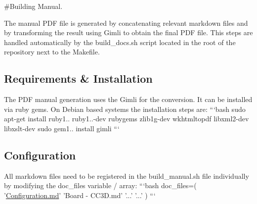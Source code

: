 \#\+Building Manual.

The manual P\+D\+F file is generated by concatenating relevant markdown files and by transforming the result using Gimli to obtain the final P\+D\+F file. This steps are handled automatically by the {\ttfamily build\+\_\+docs.\+sh} script located in the root of the repository next to the Makefile.

\subsection*{Requirements \& Installation}

The P\+D\+F manual generation uses the Gimli for the conversion. It can be installed via ruby gems. On Debian based systems the installation steps are\+: ```bash sudo apt-\/get install ruby1.. ruby1..-\/dev rubygems zlib1g-\/dev wkhtmltopdf libxml2-\/dev libxslt-\/dev sudo gem1.. install gimli ```

\subsection*{Configuration}

All markdown files need to be registered in the {\ttfamily build\+\_\+manual.\+sh} file individually by modifying the {\ttfamily doc\+\_\+files} variable / array\+: ```bash doc\+\_\+files=( '\hyperlink{Configuration_8md}{Configuration.\+md}' 'Board -\/ C\+C3\+D.\+md' '...' '...' ) ``` 